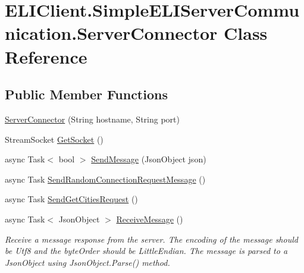 \hypertarget{class_e_l_i_client_1_1_simple_e_l_i_server_communication_1_1_server_connector}{}\section{E\+L\+I\+Client.\+Simple\+E\+L\+I\+Server\+Communication.\+Server\+Connector Class Reference}
\label{class_e_l_i_client_1_1_simple_e_l_i_server_communication_1_1_server_connector}
\subsection*{Public Member Functions}
\begin{DoxyCompactItemize}
\item 
\hyperlink{class_e_l_i_client_1_1_simple_e_l_i_server_communication_1_1_server_connector_ad9a29fa265ea9a860f92ed58c11858e6}{Server\+Connector} (String hostname, String port)
\item 
Stream\+Socket \hyperlink{class_e_l_i_client_1_1_simple_e_l_i_server_communication_1_1_server_connector_a9dcf13bb05d9d410088f319d20a5faaa}{Get\+Socket} ()
\item 
async Task$<$ bool $>$ \hyperlink{class_e_l_i_client_1_1_simple_e_l_i_server_communication_1_1_server_connector_a6c02f184947bf664847cefe578225cf5}{Send\+Message} (Json\+Object json)
\item 
async Task \hyperlink{class_e_l_i_client_1_1_simple_e_l_i_server_communication_1_1_server_connector_a51b31eed1d4faf571cc0aa512dc675c1}{Send\+Random\+Connection\+Request\+Message} ()
\item 
async Task \hyperlink{class_e_l_i_client_1_1_simple_e_l_i_server_communication_1_1_server_connector_a524197983d52fb96d7e9105c3730011a}{Send\+Get\+Cities\+Request} ()
\item 
async Task$<$ Json\+Object $>$ \hyperlink{class_e_l_i_client_1_1_simple_e_l_i_server_communication_1_1_server_connector_af805dc6dc3d37342b2ae263cf02740e3}{Receive\+Message} ()
\begin{DoxyCompactList}\small\item\em Receive a message response from the server. The encoding of the message should be Utf8 and the byte\+Order should be Little\+Endian. The message is parsed to a Json\+Object using Json\+Object.\+Parse() method. \end{DoxyCompactList}\end{DoxyCompactItemize}
